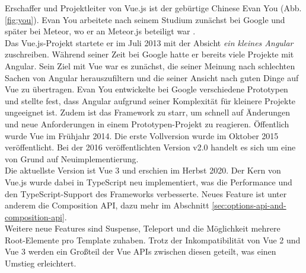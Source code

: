 Erschaffer und Projektleiter von Vue.js ist der gebürtige Chinese Evan You (Abb. \ref{fig:you}).
Evan You arbeitete nach seinem Studium zunächst bei Google und später bei Meteor, wo er
an Meteor.js beteiligt war \cite{linkedinYou}.
\\
Das Vue.js-Projekt startete er im Juli 2013 mit der Absicht \emph{ ein kleines Angular}
zuschreiben.
Während seiner Zeit bei Google hatte er bereits viele Projekte mit Angular.
Sein Ziel mit Vue war es zunächst, die seiner Meinung nach schlechten Sachen von Angular herauszufiltern
und die seiner Ansicht nach guten Dinge auf Vue zu übertragen.
Evan You entwickelte bei Google verschiedene Prototypen und stellte fest,
dass Angular aufgrund seiner Komplexität für kleinere Projekte ungeeignet ist.
Zudem ist das Framework zu starr, um schnell auf Änderungen und neue Anforderungen in einem Prototypen-Projekt zu reagieren.
Öffentlich wurde Vue im Frühjahr 2014.
Die erste Vollversion wurde im Oktober 2015 veröffentlicht.
Bei der 2016 veröffentlichten Version v2.0 handelt es sich um eine von Grund auf Neuimplementierung. \cite[1:11-4:42]{vueNYC}
\\
Die aktuellste Version ist Vue 3 und erschien im Herbst 2020.
Der Kern von Vue.js wurde dabei in TypeScript neu implementiert, was die Performance und den TypeScript-Support des Frameworks verbesserte.
Neues Feature ist unter anderem die Composition API, dazu mehr im Abschnitt \ref{sec:options-api-and-composition-api}. \cite{konstantinidis2020}
\\
Weitere neue Features sind Suspense, Teleport und die Möglichkeit mehrere Root-Elemente pro Template zuhaben.
Trotz der Inkompatibilität von Vue 2 und Vue 3 werden ein Großteil der Vue APIs zwischen diesen geteilt,
was einen Umstieg erleichtert. \cite{vueFAQ}

